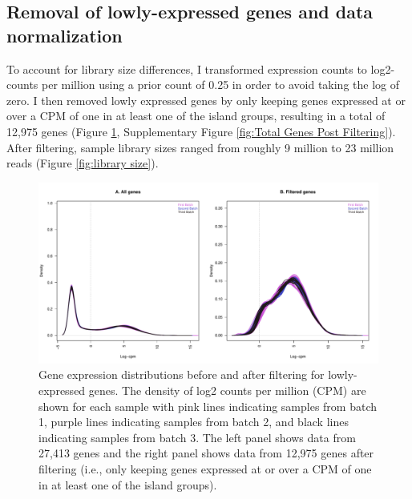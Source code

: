\documentclass[12pt,a4paper,titlepage,twoside,openright]{book}
\begin{document}
\begin{mainmatter}
{\section{Removal of lowly-expressed genes and data normalization}
To account for library size differences, I transformed expression counts to log2-counts per million using a prior count of 0.25 in order to avoid taking the log of zero. I then removed lowly expressed genes by only keeping genes expressed at or over a CPM of one in at least one of the island groups, resulting in a total of 12,975 genes (Figure \ref{fig:library density after removal of lowly-expressed genes}, Supplementary Figure \ref{fig:Total Genes Post Filtering}). After filtering, sample library sizes ranged from roughly 9 million to 23 million reads (Figure \ref{fig:library size}).

\begin{figure}[htb!]
\centering
\includegraphics[width=\textwidth,height=\textheight,keepaspectratio]{Figures/libraryDensity_afterFiltering_indoRNA.pdf}
\caption{Gene expression distributions before and after filtering for lowly-expressed genes. The density of log2 counts per million (CPM) are shown for each sample with pink lines indicating samples from batch 1, purple lines indicating samples from batch 2, and black lines indicating samples from batch 3. The left panel shows data from 27,413 genes and the right panel shows data from 12,975 genes after filtering (i.e., only keeping genes expressed at or over a CPM of one in at least one of the island groups).}
\label{fig:library density after removal of lowly-expressed genes}
\end{figure}

}
\end{mainmatter}
\end{document}
